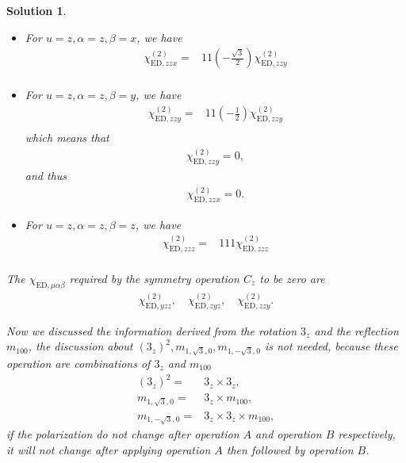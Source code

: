 \documentclass[UTF8,10pt,a4paper]{article}
\theoremstyle{Problem}
\theoremstyle{Solution}
\newtheorem*{sol}{Solution}
\begin{document}
\begin{sol}
\begin{itemize}
\begin{align}
    \chi_{\text{ED},zxz}^{(2)}=0.
\end{align}
\item For $u=z,\alpha=z,\beta=x$, we have
\small\begin{align}
\nonumber\chi_{\text{ED},zzx}^{(2)}=&11\left(-\frac{\sqrt{3}}{2}\right)\chi_{\text{ED},zzy}^{(2)}\\
&
\end{align}\normalsize
\item For $u=z,\alpha=z,\beta=y$, we have
\small\begin{align}
\nonumber\chi_{\text{ED},zzy}^{(2)}=&11\left(-\frac{1}{2}\right)\chi_{\text{ED},zzy}^{(2)}\\
&
\end{align}\normalsize
which means that
\begin{align}
    \chi_{\text{ED},zzy}^{(2)}=0,
\end{align}
and thus
\begin{align}
    \chi_{\text{ED},zzx}^{(2)}=0.
\end{align}
\item For $u=z,\alpha=z,\beta=z$, we have
\small\begin{align}
\nonumber\chi_{\text{ED},zzz}^{(2)}=&111\chi_{\text{ED},zzz}^{(2)}\\
&
\end{align}\normalsize
\end{itemize}

    The $\chi_{\text{ED},\mu\alpha\beta}$ required by the symmetry operation $C_z$ to be zero are
    \begin{gather*}
        \chi_{\text{ED},yzz}^{(2)},\quad\chi_{\text{ED},zyz}^{(2)},\quad\chi_{\text{ED},zzy}^{(2)}.
    \end{gather*}

    Now we discussed the information derived from the rotation $3_z$ and the reflection $m_{100}$, the discussion about $(3_z)^2,m_{1,\sqrt{3},0},m_{1,-\sqrt{3},0}$ is not needed, because these operation are combinations of $3_z$ and $m_{100}$
    \begin{align}
        (3_z)^2=&3_z\times 3_z,\\
        m_{1,\sqrt{3},0}=&3_z\times m_{100},\\
        m_{1,-\sqrt{3},0}=&3_z\times 3_z\times m_{100},
    \end{align}
    if the polarization do not change after operation $A$ and operation $B$ respectively, it will not change after applying operation $A$ then followed by operation $B$.


\end{sol}
\end{document}
